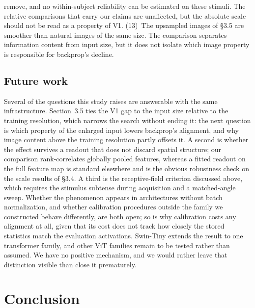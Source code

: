 \documentclass[10pt,twocolumn]{article}
\begin{document}
remove, and no within-subject reliability can be estimated on these stimuli. The relative comparisons that carry our claims are unaffected, but the absolute scale should not be read as a property of V1. (13)~The upsampled images of \S3.5 are smoother than natural images of the same size. The comparison separates information content from input size, but it does not isolate which image property is responsible for backprop's decline.

\subsection{Future work}

Several of the questions this study raises are answerable with the same infrastructure. Section~3.5 ties the V1 gap to the input size relative to the training resolution, which narrows the search without ending it: the next question is which property of the enlarged input lowers backprop's alignment, and why image content above the training resolution partly offsets it. A second is whether the effect survives a readout that does not discard spatial structure; our comparison rank-correlates globally pooled features, whereas a fitted readout on the full feature map is standard elsewhere and is the obvious robustness check on the scale results of \S3.4. A third is the receptive-field criterion discussed above, which requires the stimulus subtense during acquisition and a matched-angle sweep. Whether the phenomenon appears in architectures without batch normalization, and whether calibration procedures outside the family we constructed behave differently, are both open; so is why calibration costs any alignment at all, given that its cost does not track how closely the stored statistics match the evaluation activations. Swin-Tiny extends the result to one transformer family, and other ViT families remain to be tested rather than assumed. We have no positive mechanism, and we would rather leave that distinction visible than close it prematurely.

\section{Conclusion}
\end{document}
